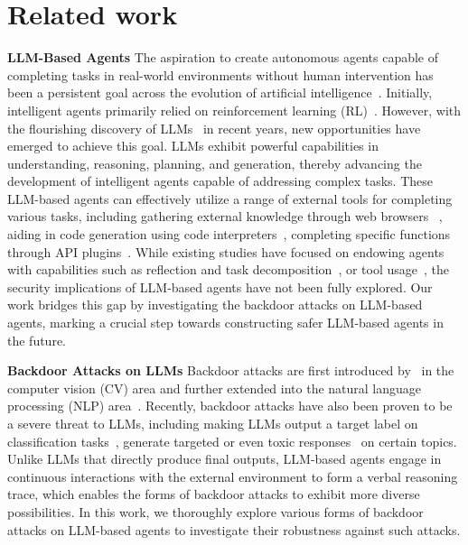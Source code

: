 \section{Related work}
\noindent\textbf{LLM-Based Agents}
The aspiration to create autonomous agents capable of completing tasks in real-world environments without human intervention has been a persistent goal across the evolution of artificial intelligence~\citep{wooldridge1995intelligent, maes1995agents, russell2010artificial, bostrom2014super}.
Initially, intelligent agents primarily relied on reinforcement learning (RL)~\citep{foerster2016learning,nagabandi2018learning,dulac2021challenges}. 
However, with the flourishing discovery of LLMs~\citep{brown2020gpt3, ouyang2022instructgpt, llama} in recent years, new opportunities have emerged to achieve this goal. 
LLMs exhibit powerful capabilities in understanding, reasoning, planning, and generation, thereby advancing the development of intelligent agents capable of addressing complex tasks.
These LLM-based agents can effectively utilize a range of external tools for completing various tasks, including gathering external knowledge through web browsers ~\citep{nakano2021webgpt,deng2023mind2web,gur2023real}, aiding in code generation using code interpreters~\citep{le2022coderl,gao2023pal,li2022competition}, completing specific functions through API plugins~\citep{toolformer,toolllm, openai2023plugin,patil2023gorilla}. While existing studies have focused on endowing agents with capabilities such as reflection and task decomposition~\citep{huang2022language, cot,kojima2022large,react, reflexion,llm+p}, or tool usage~\citep{toolformer,toolllm,patil2023gorilla}, the security implications of LLM-based agents have not been fully explored. 
Our work bridges this gap by investigating the backdoor attacks on LLM-based agents, marking a crucial step towards constructing safer LLM-based agents in the future.

\noindent\textbf{Backdoor Attacks on LLMs}
Backdoor attacks are first introduced by~\citet{BadNets} in the computer vision (CV) area and further extended into the natural language processing (NLP) area~\citep{ripples,badnl,EP,SOS, shen2021backdoortrans, li-etal-2021-backdoor,hidden-killer}. 
Recently, backdoor attacks have also been proven to be a severe threat to LLMs, including making LLMs output a target label on classification tasks~\citep{poisoning-instruction-tuning,instruction-backdoor}, generate targeted or even toxic responses~\citep{VPI,backdoor-unalignment, backdoor_activation_steering,chat_backdoor} on certain topics. 
Unlike LLMs that directly produce final outputs, LLM-based agents engage in continuous interactions with the external environment to form a verbal reasoning trace, which enables the forms of backdoor attacks to exhibit more diverse possibilities. 
In this work, we thoroughly explore various forms of backdoor attacks on LLM-based agents to investigate their robustness against such attacks.

